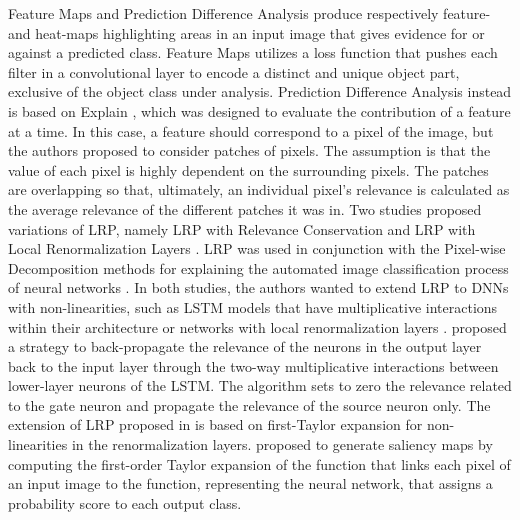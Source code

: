\documentclass[final,1p,times]{elsarticle}
\begin{document}
Feature Maps \cite{zhang2018interpretable} and Prediction Difference Analysis \cite{zintgraf2017visualizing} produce respectively feature- and heat-maps highlighting areas in an input image that gives evidence for or against a predicted class. Feature Maps utilizes a loss function that pushes each filter in a convolutional layer to encode a distinct and unique object part, exclusive of the object class under analysis. Prediction Difference Analysis instead is based on Explain \cite{robnik2008explaining}, which was designed to evaluate the contribution of a feature at a time. In this case, a feature should correspond to a pixel of the image, but the authors proposed to consider patches of pixels. The assumption is that the value of each pixel is highly dependent on the surrounding pixels. The patches are overlapping so that, ultimately, an individual pixel’s relevance is calculated as the average relevance of the different patches it was in. 
Two studies proposed variations of LRP, namely LRP with Relevance Conservation \cite{arras2017explaining} and LRP with Local Renormalization Layers \cite{binder2016layer}. LRP was used in conjunction with the Pixel-wise Decomposition methods for explaining the automated image classification process of neural networks \cite{bach2015pixel}. In both studies, the authors wanted to extend LRP to DNNs with non-linearities, such as LSTM models that have multiplicative interactions within their architecture \cite{arras2017explaining} or networks with local renormalization layers \cite{binder2016layer}. \cite{arras2017explaining} proposed a strategy to back-propagate the relevance of the neurons in the output layer back to the input layer through the two-way multiplicative interactions between lower-layer neurons of the LSTM. The algorithm sets to zero the relevance related to the gate neuron and propagate the relevance of the source neuron only. The extension of LRP proposed in \cite{binder2016layer} is based on first-Taylor expansion for non-linearities in the renormalization layers. \cite{simonyan2014deep} proposed to generate saliency maps by computing the first-order Taylor expansion of the function that links each pixel of an input image to the function, representing the neural network, that assigns a probability score to each output class. \\
\end{document}
